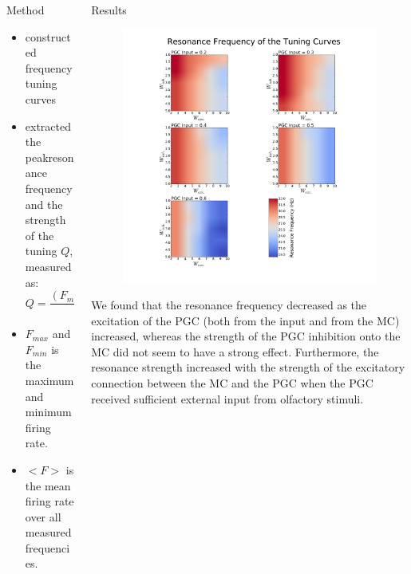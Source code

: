 \documentclass[final,hyperref={pdfpagelabels=false}]{beamer}
\begin{document}
\begin{frame}{}
\begin{columns}[t]
\begin{column}{.48\linewidth}
\begin{block}{Method}
\begin{itemize}
\item constructed frequency tuning curves
\item extracted the peakresonance frequency and the strength of the tuning $Q$, measured as:
\begin{equation}
Q = \frac{(F_{max} - F_{min})}{<F>}
\end{equation}
\item $F_{max}$ and $F_{min}$ is the maximum and minimum firing rate.
\item $<F>$ is the mean firing rate over all measured frequencies.
\end{itemize}
      	
\end{block}

\end{column}




    \begin{column}{.48\linewidth}
      \begin{block}{Results}
      	\begin{figure}
      		\center
      		\includegraphics[scale=0.5]{images/Contour_plot_tuning_frequency}
      		\end{figure} 
        We found that the resonance frequency decreased as the excitation of the PGC (both from the input and from the MC) increased, whereas the strength of the PGC inhibition onto the MC did not seem to have a strong effect. 
        Furthermore, the resonance strength increased with the strength of the excitatory connection between the MC and the PGC when the PGC received sufficient external input from olfactory stimuli.
      \end{block}


\end{column}
\end{columns}
\end{frame}
\end{document}
